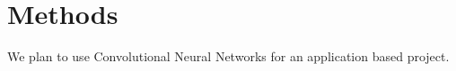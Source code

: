 \section{Methods}



We plan to use Convolutional Neural Networks for an application based project.

